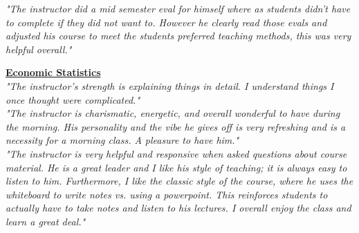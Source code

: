 \documentclass[a4paper,11pt]{article}
\begin{document}
\textit{"The instructor did a mid semester eval for himself where as students didn't have to complete if they did not want to. However he clearly read those evals and adjusted his course to meet the students preferred teaching methods, this was very helpful overall."} \\


\newpage

\ul{\textbf{Economic Statistics}} \\

\textit{"The instructor's strength is explaining things in detail. I understand things I once thought were complicated."} \\

\textit{"The instructor is charismatic, energetic, and overall wonderful to have during the morning. His personality and the vibe he gives off is very refreshing and is a necessity for a morning class. A pleasure to have him."} \\

\textit{"The instructor is very helpful and responsive when asked questions about course material. He is a great leader and I like his style of teaching; it is always easy to listen to him. Furthermore, I like the classic style of the course, where he uses the whiteboard to write notes vs. using a powerpoint. This reinforces students to actually have to take notes and listen to his lectures. I overall enjoy the class and learn a great deal."} \\
\end{document}
